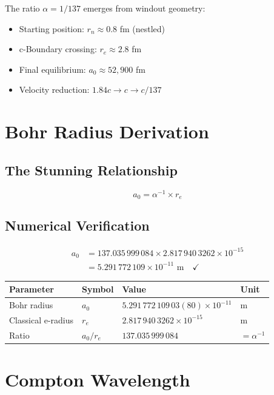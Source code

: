 \documentclass{article}
\begin{document}
The ratio $\alpha = 1/137$ emerges from windout geometry:

\begin{itemize}
\item Starting position: $r_n \approx 0.8$ fm (nestled)
\item c-Boundary crossing: $r_e \approx 2.8$ fm
\item Final equilibrium: $a_0 \approx 52,900$ fm
\item Velocity reduction: $1.84c \to c \to c/137$
\end{itemize}

\section{Bohr Radius Derivation}

\subsection{The Stunning Relationship}

\begin{equation}
a_0 = \alpha^{-1} \times r_e
\end{equation}

\subsection{Numerical Verification}

\begin{align}
a_0 &= 137.035\,999\,084 \times 2.817\,940\,3262 \times 10^{-15} \\
&= 5.291\,772\,109 \times 10^{-11} \text{ m} \quad \checkmark
\end{align}

\begin{longtable}{llll}
\toprule
\textbf{Parameter} & \textbf{Symbol} & \textbf{Value} & \textbf{Unit} \\
\midrule
Bohr radius & $a_0$ & $5.291\,772\,109\,03(80) \times 10^{-11}$ & m \\
Classical e-radius & $r_e$ & $2.817\,940\,3262 \times 10^{-15}$ & m \\
Ratio & $a_0/r_e$ & $137.035\,999\,084$ & $= \alpha^{-1}$ \\
\bottomrule
\end{longtable}

\section{Compton Wavelength}
\end{document}

